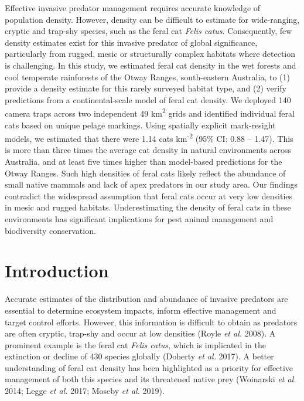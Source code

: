 \documentclass[11pt,a4paper,titlepage,twoside,openright]{style/unimelbthesis}
\begin{document}
\begin{mainmatter}
Effective invasive predator management requires accurate knowledge of population density. However, density can be difficult to estimate for wide-ranging, cryptic and trap-shy species, such as the feral cat \emph{Felis catus}. Consequently, few density estimates exist for this invasive predator of global significance, particularly from rugged, mesic or structurally complex habitats where detection is challenging. In this study, we estimated feral cat density in the wet forests and cool temperate rainforests of the Otway Ranges, south-eastern Australia, to (1) provide a density estimate for this rarely surveyed habitat type, and (2) verify predictions from a continental-scale model of feral cat density. We deployed 140 camera traps across two independent 49 km\textsuperscript{2} grids and identified individual feral cats based on unique pelage markings. Using spatially explicit mark-resight models, we estimated that there were 1.14 cats km\textsuperscript{-2} (95\% CI: 0.88 -- 1.47). This is more than three times the average cat density in natural environments across Australia, and at least five times higher than model-based predictions for the Otway Ranges. Such high densities of feral cats likely reflect the abundance of small native mammals and lack of apex predators in our study area. Our findings contradict the widespread assumption that feral cats occur at very low densities in mesic and rugged habitats. Underestimating the density of feral cats in these environments has significant implications for pest animal management and biodiversity conservation.

\newpage

\hypertarget{introduction}{%
\section{Introduction}\label{introduction}}

Accurate estimates of the distribution and abundance of invasive predators are essential to determine ecosystem impacts, inform effective management and target control efforts. However, this information is difficult to obtain as predators are often cryptic, trap-shy and occur at low densities (Royle \emph{et al.} 2008). A prominent example is the feral cat \emph{Felis catus}, which is implicated in the extinction or decline of 430 species globally (Doherty \emph{et al.} 2017). A better understanding of feral cat density has been highlighted as a priority for effective management of both this species and its threatened native prey (Woinarski \emph{et al.} 2014; Legge \emph{et al.} 2017; Moseby \emph{et al.} 2019).


\end{mainmatter}
\end{document}

